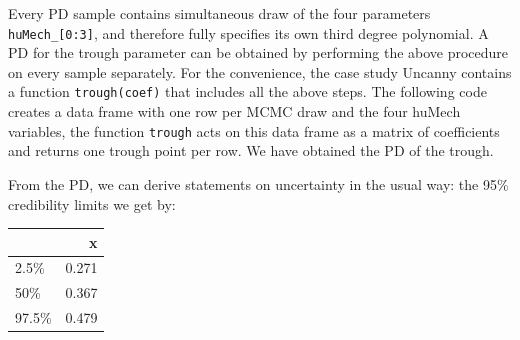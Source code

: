 \documentclass[]{svmono}
\newenvironment{Shaded}{\begin{snugshade}}{\end{snugshade}}
\newcommand{\KeywordTok}[1]{\textcolor[rgb]{0.13,0.29,0.53}{\textbf{#1}}}
\newcommand{\DataTypeTok}[1]{\textcolor[rgb]{0.13,0.29,0.53}{#1}}
\newcommand{\DecValTok}[1]{\textcolor[rgb]{0.00,0.00,0.81}{#1}}
\newcommand{\FloatTok}[1]{\textcolor[rgb]{0.00,0.00,0.81}{#1}}
\newcommand{\StringTok}[1]{\textcolor[rgb]{0.31,0.60,0.02}{#1}}
\newcommand{\OperatorTok}[1]{\textcolor[rgb]{0.81,0.36,0.00}{\textbf{#1}}}
\newcommand{\NormalTok}[1]{#1}
\begin{document}
Every PD sample contains simultaneous draw of the four parameters
\texttt{huMech\_{[}0:3{]}}, and therefore fully specifies its own third
degree polynomial. A PD for the trough parameter can be obtained by
performing the above procedure on every sample separately. For the
convenience, the case study Uncanny contains a function
\texttt{trough(coef)} that includes all the above steps. The following
code creates a data frame with one row per MCMC draw and the four huMech
variables, the function \texttt{trough} acts on this data frame as a
matrix of coefficients and returns one trough point per row. We have
obtained the PD of the trough.

\begin{Shaded}
\end{Shaded}

From the PD, we can derive statements on uncertainty in the usual way:
the 95\% credibility limits we get by:

\begin{Shaded}
\end{Shaded}

\begin{tabular}{l|r}
\hline
  & x\\
\hline
2.5\% & 0.271\\
\hline
50\% & 0.367\\
\hline
97.5\% & 0.479\\
\hline
\end{tabular}
\end{document}
